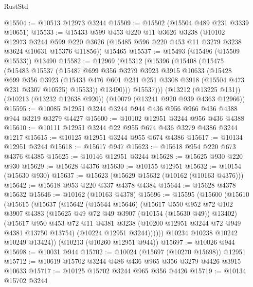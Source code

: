 \begin{lexlean}{RustStd}
\begin{coremodule}
{\begin{coremodule}
{{{{{{{{{{{{{{{{{{{{{{{{{{@15504 := @10513 @12973 @3244
@15509 := @15502 (@15504 @489 @231 @3339 @10651)
@15533 := @15433
    @599
    @453
    @220
    @11
    @3626
    @3238
    (@10102
      @12973
      @3244
      @599
      @220
      @3626
      (@15485 @596 @220 @453 @11 @3279 @3238 @3624 @10631 @15376 @11856))
    @15465
@15537 := @15493 (@15496 (@15509 @15533)) @13490
@15582 := @12969
    (@15312
      (@15396
        (@15408
          (@15475
            (@15483
              @15537
              (@15487
                @699
                @356
                @3279
                @3923
                @3915
                @10633
                (@15428
                  @699
                  @356
                  @3923
                  (@15433 @476 @601 @231 @251 @3308 @3918 (@15504 @473 @231 @3307 @10525) @15533))
                @13490)))
          @15537)))
    (@13212 (@13225 @131))
    (@10213 (@13232 @12638 @920))
    (@10079 (@13241 @920 @939 @4363 @12966))
@15595 := @10085 @12951 @3244 @3244 @944 @436 @956 @966 @436 @4388 @944 @3219 @3279 @4427
@15600 := @10102 @12951 @3244 @956 @436 @4388
@15610 := @10111 @12951 @3244 @22 @955 @674 @436 @3279 @4386 @3244 @1217
@15615 := @10125 @12951 @3244 @955 @674 @4386
@15617 := @10134 @12951 @3244
@15618 := @15617 @947
@15623 := @15618 @954 @220 @673 @4376 @4385
@15625 := @10146 @12951 @3244
@15628 := @15625 @930 @220 @930
@15629 := @15628 @4376
@15630 := @10155 @12951
@15632 := @10154 (@15630 @930)
@15637 := @15623 (@15629 @15632 (@10162 (@10163 @4376)))
@15642 := @15618 @953 @220 @337 @4378 @4384
@15644 := @15628 @4378 @15632
@15646 := @10162 (@10163 @4378)
@15696 := @15595
    (@15600
      (@15610
        (@15615
          (@15637
            (@15642
              (@15644 @15646)
              (@15617
                @550
                @952
                @72
                @102
                @3907
                @4383
                (@15625 @49 @72 @49 @3907 (@10154 (@15630 @49)) @13402)
                (@15617
                  @950
                  @453
                  @72
                  @11
                  @4381
                  @3238
                  (@10200 @12951 @3244 @72 @949 @4381 @13750 @13754)
                  (@10224 @12951 @3244))))))
        @10234
        @10238
        @10242
        @10249
        @13424))
    (@10213 (@10260 @12951 @944))
@15697 := @10026 @944
@15698 := @10031 @944
@15702 := @10024 (@15697 (@10270 @15698)) @12951
@15712 := @10619 @15702 @3244 @486 @436 @965 @356 @3279 @4426 @3915 @10633
@15717 := @10125 @15702 @3244 @965 @356 @4426
@15719 := @10134 @15702 @3244
}}}}}}}}}}}}}}}}}}}}}}}}}}
\end{coremodule}}
\end{coremodule}
\end{lexlean}
